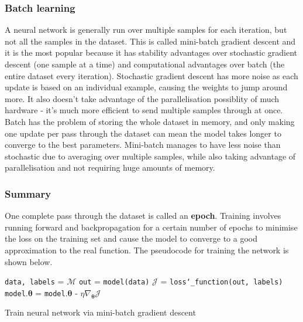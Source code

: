 \documentclass[12pt,a4paper,twoside,openright]{report}
\renewcommand{\vec}[1]{\bm{#1}}
\begin{document}
\subsubsection{Batch learning}

A neural network is generally run over multiple samples for each iteration, but not all the samples in the dataset. This is called 
mini-batch gradient descent and it is the most popular because it has stability advantages over stochastic gradient descent (one sample at a time)
and computational advantages over batch (the entire dataset every iteration). 
Stochastic gradient descent has more noise as each update is based on an individual example, causing the weights to jump around more. It also doesn't take advantage of the 
parallelisation possiblity of much hardware - it's much more efficient to send multiple samples through at once. Batch has the problem of storing the whole 
dataset in memory, and only making one update per pass through the dataset can mean the model takes longer to converge to the best parameters. Mini-batch manages to
have less noise than stochastic due to averaging over multiple samples, while also taking advantage of parallelisation and not requiring huge amounts of memory.

\subsubsection{Summary}

One complete pass through the dataset is called an \textbf{epoch}. Training involves running forward and backpropagation for a certain number of epochs to minimise the loss
on the training set and cause the model to converge to a good approximation to the real function. The pseudocode for training the network is shown below.
\begin{algorithm}
  \begin{algorithmic}[1]
    \State \texttt{data, labels} = $\mathcal{M}$
    \State \texttt{out} = \texttt{model(data)}
    \State $\mathcal{J}$ = \texttt{loss\char`_function(out, labels)}
    \State \texttt{model}.$\vec{\theta}$ = \texttt{model}.$\vec{\theta}$ - $\eta \nabla_{\vec{\theta}} \mathcal{J}$ 
    \EndFor
    \EndFor
    \EndProcedure
  \end{algorithmic}
  \caption{Train neural network via mini-batch gradient descent} 
  \label{alg:train}
\end{algorithm}
\end{document}
